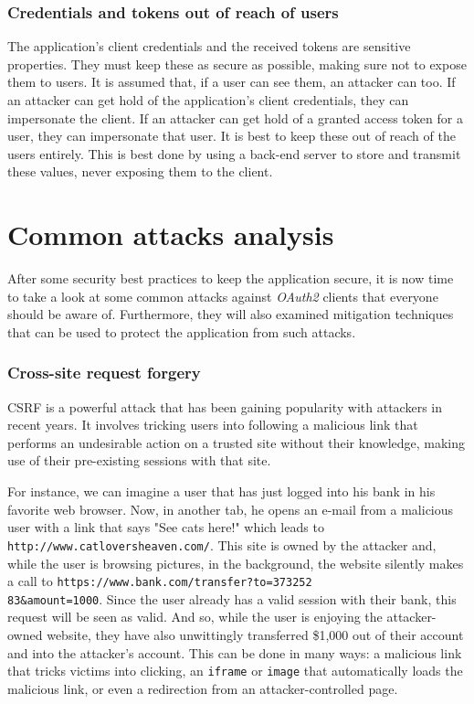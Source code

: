 \subsubsection{Credentials and tokens out of reach of users}
The application's client credentials and the received tokens are sensitive properties. They must keep these as secure as possible, making sure not to expose them to users. It is assumed that, if a user can see them, an attacker can too. If an attacker can get hold of the application's client credentials, they can impersonate the client. If an attacker can get hold of a granted access token for a user, they can impersonate that user. It is best to keep these out of reach of the users entirely. This is best done by using a back-end server to store and transmit these values, never exposing them to the client.

\section{Common attacks analysis}
After some security best practices to keep the application secure, it is now time to take a look at some common attacks against \textit{OAuth2} clients that everyone should be aware of. Furthermore, they will also examined mitigation techniques that can be used to protect the application from such attacks.

\subsubsection{Cross-site request forgery}
\label{csrf}
CSRF is a powerful attack that has been gaining popularity with attackers in recent years. It involves tricking users into following a malicious link that performs an undesirable action on a trusted site without their knowledge, making use of their pre-existing sessions with that site.

For instance, we can imagine a user that has just logged into his bank in his favorite web browser. Now, in another tab, he opens an e-mail from a malicious user with a link that says "See cats here!" which leads to \texttt{http://www.catloversheaven.com/}.
This site is owned by the attacker and, while the user is browsing pictures, in the background, the website silently makes a call to \texttt{https://www.bank.com/transfer?to=373252 \\ 83\&amount=1000}.
Since the user already has a valid session with their bank, this request will be seen as valid. And so, while the user is enjoying the attacker-owned website, they have also unwittingly transferred \$1,000 out of their account and into the
attacker's account. This can be done in many ways: a malicious link that tricks victims into clicking, an \texttt{iframe} or \texttt{image} that automatically loads the malicious link, or even a redirection from an attacker-controlled page.

